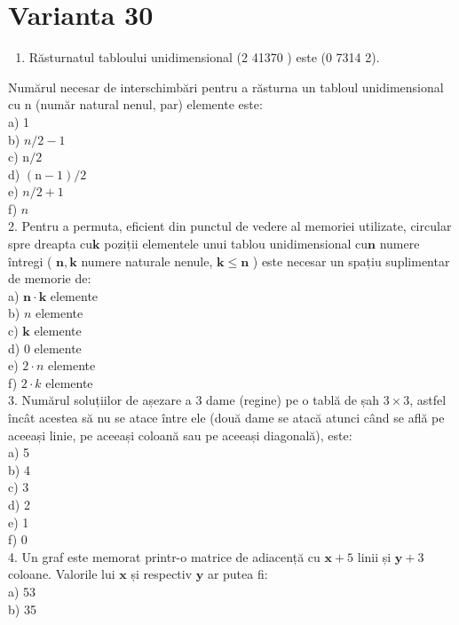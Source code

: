 \documentclass[10pt]{article}
\begin{document}
\section*{Varianta 30}
\begin{enumerate}
  \item Răsturnatul tabloului unidimensional (2 41370 ) este (0 7314 2).
\end{enumerate}

Numărul necesar de interschimbări pentru a răsturna un tabloul unidimensional cu n (număr natural nenul, par) elemente este:\\
a) 1\\
b) $n / 2-1$\\
c) $\mathrm{n} / 2$\\
d) $(\mathrm{n}-1) / 2$\\
e) $n / 2+1$\\
f) $n$\\
2. Pentru a permuta, eficient din punctul de vedere al memoriei utilizate, circular spre dreapta $\mathrm{cu} \mathbf{k}$ poziții elementele unui tablou unidimensional $\mathrm{cu} \mathbf{n}$ numere întregi ( $\mathbf{n}, \mathbf{k}$ numere naturale nenule, $\mathbf{k} \leq \mathbf{n}$ ) este necesar un spațiu suplimentar de memorie de:\\
a) $\mathbf{n} \cdot \mathbf{k}$ elemente\\
b) $n$ elemente\\
c) $\mathbf{k}$ elemente\\
d) 0 elemente\\
e) $2 \cdot n$ elemente\\
f) $2 \cdot k$ elemente\\
3. Numărul soluțiilor de așezare a 3 dame (regine) pe o tablă de șah $3 \times 3$, astfel încât acestea să nu se atace între ele (două dame se atacă atunci când se află pe aceeași linie, pe aceeași coloană sau pe aceeași diagonală), este:\\
a) 5\\
b) 4\\
c) 3\\
d) 2\\
e) 1\\
f) 0\\
4. Un graf este memorat printr-o matrice de adiacență cu $\mathbf{x}+5$ linii și $\mathbf{y}+3$ coloane. Valorile lui $\mathbf{x}$ și respectiv $\mathbf{y}$ ar putea fi:\\
a) 53\\
b) 35\\
\end{document}
